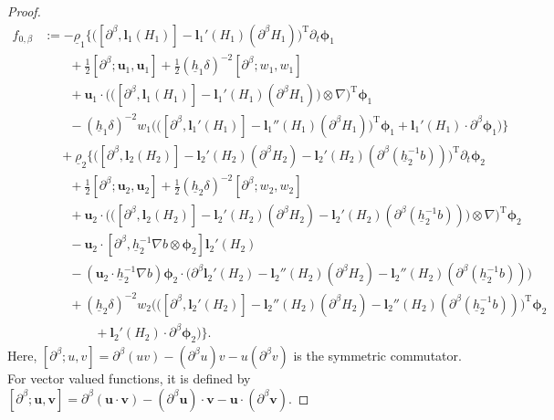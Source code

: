 \documentclass[11pt,leqno]{article}
\numberwithin{equation}{section}
\numberwithin{figure}{section}
\begin{document}
\begin{proof}
\begin{align}
f_{0,\beta} \label{f0beta}
&:= -\underline{\rho}_1\bigl\{
 \bigl( [\partial^\beta,\bm{l}_1(H_1)] - \bm{l}_1'(H_1)(\partial^\beta H_1) \bigr)^\mathrm{T}
  \partial_t\bm{\phi}_1 \\
&\qquad
  + \tfrac12[\partial^\beta;\bm{u}_1,\bm{u}_1] + \tfrac12(\underline{h}_1\delta)^{-2}[\partial^\beta;w_1,w_1]  \nonumber \\
&\qquad
 + \bm{u}_1\cdot\bigl( \bigl( [\partial^\beta,\bm{l}_1(H_1)] - \bm{l}_1'(H_1)(\partial^\beta H_1)
  \bigr) \otimes \nabla \bigr)^\mathrm{T}\bm{\phi}_1 \nonumber \\
&\qquad
 - (\underline{h}_1\delta)^{-2}w_1\bigl( \bigl( 
  [\partial^\beta,\bm{l}_1'(H_1)] - \bm{l}_1''(H_1)(\partial^\beta H_1) \bigr)^\mathrm{T}\bm{\phi}_1 
   +\bm{l}_1'(H_1)\cdot \partial^\beta \bm{\phi}_1 \bigr) \bigr\}
   \nonumber \\
&\quad\;
 + \underline{\rho}_2\bigl\{
 \bigl( [\partial^\beta,\bm{l}_2(H_2)]-\bm{l}_2'(H_2)(\partial^\beta H_2)
  - \bm{l}_2'(H_2)(\partial^\beta(\underline{h}_2^{-1}b))  \bigr)^\mathrm{T}
  \partial_t\bm{\phi}_2 \nonumber \\
&\qquad
  + \tfrac12[\partial^\beta;\bm{u}_2,\bm{u}_2] + \tfrac12(\underline{h}_2\delta)^{-2}[\partial^\beta;w_2,w_2] \nonumber \\
&\qquad
 + \bm{u}_2\cdot\bigl( \bigl( [\partial^\beta,\bm{l}_2(H_2)]-\bm{l}_2'(H_2)(\partial^\beta H_2)
  - \bm{l}_2'(H_2)(\partial^\beta(\underline{h}_2^{-1}b))
  \bigr) \otimes \nabla \bigr)^\mathrm{T}\bm{\phi}_2 \nonumber \\
&\qquad
 - \bm{u}_2\cdot[\partial^\beta,\underline{h}_2^{-1}\nabla b\otimes\bm{\phi}_2]\bm{l}_2'(H_2) \nonumber \\
&\qquad
 - (\bm{u}_2\cdot\underline{h}_2^{-1}\nabla b)\bm{\phi}_2\cdot
  \bigl( \partial^\beta\bm{l}_2'(H_2)-\bm{l}_2''(H_2)(\partial^\beta H_2)
 - \bm{l}_2''(H_2)(\partial^\beta(\underline{h}_2^{-1}b)) \bigr) \nonumber \\
&\qquad
 + (\underline{h}_2\delta)^{-2}w_2\bigl(\bigl( 
  [\partial^\beta,\bm{l}_2'(H_2)]-\bm{l}_2''(H_2)(\partial^\beta H_2)
   - \bm{l}_2''(H_2)(\partial^\beta(\underline{h}_2^{-1}b)) \bigr)^\mathrm{T}\bm{\phi}_2 \nonumber \\
&\qquad\qquad
   + \bm{l}_2'(H_2)\cdot \partial^\beta \bm{\phi}_2 \bigr) \bigr\}.
  \nonumber 
\end{align}
%
Here, $[\partial^\beta;u,v] = \partial^\beta(uv)-(\partial^\beta u)v-u(\partial^\beta v)$ is the symmetric commutator. 
For vector valued functions, it is defined by $[\partial^\beta;\bm{u},\bm{v}] = \partial^\beta(\bm{u}\cdot\bm{v})
 - (\partial^\beta \bm{u})\cdot\bm{v} - \bm{u}\cdot(\partial^\beta\bm{v})$. 



\end{proof}
\end{document}
